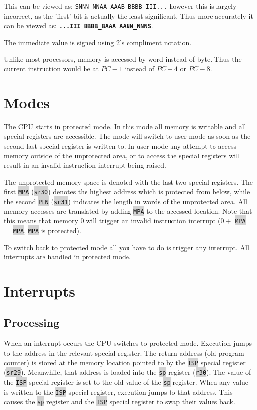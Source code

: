 \documentclass{article}
\newcommand{\labcode}[1]{\colorbox{lightgray}{\lstinline[language=lab]{#1}}}
\begin{document}
This can be viewed as: \texttt{SNNN\_NNAA AAAB\_BBBB III...} however this is
largely incorrect, as the 'first' bit is actually the least significant. Thus
more accurately it can be viewed as: \texttt{\textbf{...III BBBB\_BAAA AANN\_NNNS}}.

The immediate value is signed using 2's compliment notation.

Unlike most processors, memory is accessed by word instead of byte. Thus the
current instruction would be at $PC-1$ instead of $PC-4$ or $PC-8$.

\section{Modes}

The CPU starts in protected mode. In this mode all memory is writable and all
special registers are accessible. The mode will switch to user mode as soon as
the second-last special register is written to. In user mode any attempt to
access memory outside of the unprotected area, or to access the special
registers will result in an invalid instruction interrupt being raised.

The unprotected memory space is denoted with the last two special registers. The
first \labcode{MPA} (\labcode{sr30}) denotes the highest address which is
protected from below, while the second \labcode{PLN} (\labcode{sr31}) indicates
the length in words of the unprotected area. All memory accesses are translated
by adding \labcode{MPA} to the accessed location. Note that this means that
memory 0 will trigger an invalid instruction interrupt ($0 + $
\labcode{MPA}$=$\labcode{MPA}, \labcode{MPA} is protected).

To switch back to protected mode all you have to do is trigger any interrupt.
All interrupts are handled in protected mode.

\section{Interrupts}

\subsection{Processing}

When an interrupt occurs the CPU switches to protected mode. Execution jumps to
the address in the relevant special register. The return address (old program
counter) is stored at the memory location pointed to by the \labcode{ISP}
special register (\labcode{sr29}). Meanwhile, that address is loaded into
the \labcode{sp} register (\labcode{r30}). The value of the \labcode{ISP}
special register is set to the old value of the \labcode{sp} register. When any
value is written to the \labcode{ISP} special register, execution jumps to that
address. This causes the \labcode{sp} register and the \labcode{ISP} special
register to swap their values back.
\end{document}
